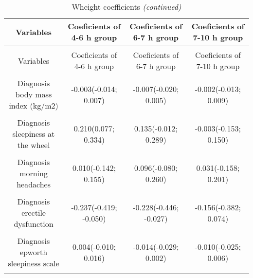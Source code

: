 \documentclass[../matsup.tex]{subfiles}
\begin{document}
\begin{longtable}[t]{cccc}
\caption{\label{tab:Wheight_coefficients}Wheight coefficients}\\
\toprule
Variables & Coeficients of 4-6 h group & Coeficients of 6-7 h group & Coeficients of 7-10 h group\\
\midrule
\endfirsthead
\caption[]{Wheight coefficients \textit{(continued)}}\\
\toprule
Variables & Coeficients of 4-6 h group & Coeficients of 6-7 h group & Coeficients of 7-10 h group\\
\midrule
\endhead

\endfoot
\bottomrule
\endlastfoot
\cellcolor{gray!6}{Diagnosis age (years)} & \cellcolor{gray!6}{0.011(0.006; 0.016)} & \cellcolor{gray!6}{0.022(0.017; 0.028)} & \cellcolor{gray!6}{0.029(0.023; 0.035)}\\
Diagnosis body mass index (kg/m2) & -0.003(-0.014; 0.007) & -0.007(-0.020; 0.005) & -0.002(-0.013; 0.009)\\
\cellcolor{gray!6}{Diagnosis cervical circumference} & \cellcolor{gray!6}{0.003(-0.014; 0.021)} & \cellcolor{gray!6}{0.024(0.005; 0.044)} & \cellcolor{gray!6}{0.027(0.008; 0.048)}\\
Diagnosis sleepiness at the wheel & 0.210(0.077; 0.334) & 0.135(-0.012; 0.289) & -0.003(-0.153; 0.150)\\
\cellcolor{gray!6}{Diagnosis morning tiredness} & \cellcolor{gray!6}{0.049(-0.101; 0.202)} & \cellcolor{gray!6}{0.010(-0.160; 0.174)} & \cellcolor{gray!6}{0.119(-0.062; 0.297)}\\
Diagnosis morning headaches & 0.010(-0.142; 0.155) & 0.096(-0.080; 0.260) & 0.031(-0.158; 0.201)\\
\cellcolor{gray!6}{Diagnosis libido disorder} & \cellcolor{gray!6}{-0.013(-0.179; 0.152)} & \cellcolor{gray!6}{0.129(-0.061; 0.316)} & \cellcolor{gray!6}{-0.014(-0.221; 0.180)}\\
Diagnosis erectile dysfunction & -0.237(-0.419; -0.050) & -0.228(-0.446; -0.027) & -0.156(-0.382; 0.074)\\
\cellcolor{gray!6}{Diagnosis night sweating} & \cellcolor{gray!6}{-0.025(-0.154; 0.105)} & \cellcolor{gray!6}{-0.011(-0.170; 0.163)} & \cellcolor{gray!6}{0.024(-0.142; 0.192)}\\
Diagnosis epworth sleepiness scale & 0.004(-0.010; 0.016) & -0.014(-0.029; 0.002) & -0.010(-0.025; 0.006)\\
\cellcolor{gray!6}{Diagnosis pichot's fatigue scale} & \cellcolor{gray!6}{0.006(-0.005; 0.017)} & \cellcolor{gray!6}{0.027(0.015; 0.040)} & \cellcolor{gray!6}{0.025(0.012; 0.038)}\\

\end{longtable}
\end{document}

